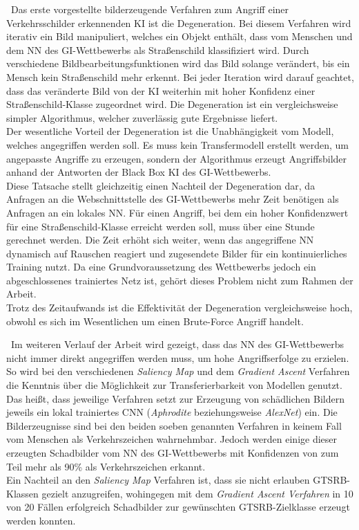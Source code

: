 ~\newline Das erste vorgestellte bilderzeugende Verfahren zum Angriff einer Verkehrsschilder erkennenden \ac{KI} ist die Degeneration. Bei diesem Verfahren wird iterativ ein Bild manipuliert, welches ein Objekt enthält, dass vom Menschen und dem \ac{NN} des \ac{GI}-Wettbewerbs als Straßenschild klassifiziert wird. Durch verschiedene Bildbearbeitungsfunktionen wird das Bild solange verändert, bis ein Mensch kein Straßenschild mehr erkennt. Bei jeder Iteration wird darauf geachtet, dass das veränderte Bild von der \ac{KI} weiterhin mit hoher Konfidenz einer Straßenschild-Klasse zugeordnet wird. Die Degeneration ist ein vergleichsweise simpler Algorithmus, welcher zuverlässig gute Ergebnisse liefert.\\ 
Der wesentliche Vorteil der Degeneration ist die Unabhängigkeit vom Modell, welches angegriffen werden soll. Es muss kein Transfermodell erstellt werden, um angepasste Angriffe zu erzeugen, sondern der Algorithmus erzeugt Angriffsbilder anhand der Antworten der Black Box \ac{KI} des \ac{GI}-Wettbewerbs.\\
Diese Tatsache stellt gleichzeitig einen Nachteil der Degeneration dar, da Anfragen an die Webschnittstelle des \ac{GI}-Wettbewerbs mehr Zeit benötigen als Anfragen an ein lokales \ac{NN}. Für einen Angriff, bei dem ein hoher Konfidenzwert für eine Straßenschild-Klasse erreicht werden soll, muss über eine Stunde gerechnet werden. Die Zeit erhöht sich weiter, wenn das angegriffene \ac{NN} dynamisch auf Rauschen reagiert und zugesendete Bilder für ein kontinuierliches Training nutzt. Da eine Grundvoraussetzung des Wettbewerbs jedoch ein abgeschlossenes trainiertes Netz ist, gehört dieses Problem nicht zum Rahmen der Arbeit. \\
Trotz des Zeitaufwands ist die Effektivität der Degeneration vergleichsweise hoch, obwohl es sich im Wesentlichen um einen Brute-Force Angriff handelt. 

~\newline Im weiteren Verlauf der Arbeit wird gezeigt, dass das \ac{NN} des \ac{GI}-Wettbewerbs nicht immer direkt angegriffen werden muss, um hohe Angriffserfolge zu erzielen. So wird bei den verschiedenen \textit{Saliency Map} und dem \textit{Gradient Ascent} Verfahren die Kenntnis über die Möglichkeit zur Transferierbarkeit von Modellen genutzt. Das heißt, dass jeweilige Verfahren setzt zur Erzeugung von schädlichen Bildern jeweils ein lokal trainiertes \ac{CNN} (\textit{Aphrodite} beziehungsweise \textit{AlexNet}) ein. Die Bilderzeugnisse sind bei den beiden soeben genannten Verfahren in keinem Fall vom Menschen als Verkehrszeichen wahrnehmbar. Jedoch werden einige dieser erzeugten Schadbilder vom \ac{NN} des \ac{GI}-Wettbewerbs mit Konfidenzen von zum Teil mehr als 90\% als Verkehrszeichen erkannt.\\
Ein Nachteil an den \textit{Saliency Map} Verfahren ist, dass sie nicht erlauben \ac{GTSRB}-Klassen gezielt anzugreifen, wohingegen mit dem \textit{Gradient Ascent Verfahren} in 10 von 20 Fällen erfolgreich Schadbilder zur gewünschten \ac{GTSRB}-Zielklasse erzeugt werden konnten.


